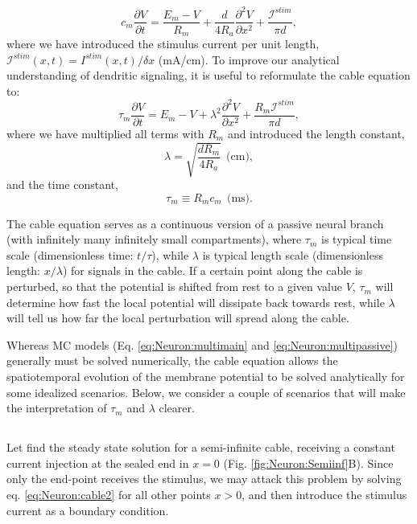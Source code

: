 \begin{equation}
c_m \frac{\partial V}{\partial t} = \frac{E_m-V}{R_m} +  \frac{d}{4 R_a}  \frac{\partial^2 V}{\partial x^2}  + \frac{\mathcal{I}^{stim}}{\pi d},
\label{eq:Neuron:cable}
\end{equation}
where we have  introduced the stimulus current per unit length, $\mathcal{I}^{stim}(x,t) = I^{stim}(x,t)/\delta x$ (mA/cm). To improve our analytical understanding of dendritic signaling, it is useful to reformulate the cable equation to:
\begin{equation}
\tau_m \frac{\partial V}{\partial t} = E_m-V +   \lambda^2  \frac{\partial^2 V}{\partial x^2}  + \frac{R_m \mathcal{I}^{stim} }{\pi d},
\label{eq:Neuron:cable2}
\end{equation}
where we have multiplied all terms with $R_m$ and introduced the length constant,
\begin{equation}
\lambda = \sqrt{\frac{d R_m}{4 R_a}} \,\; \text{(cm)}, 
\label{eq:Neuron:lengthconst}
\end{equation}
and the time constant, 
\begin{equation}
\tau_m \equiv R_m c_m  \,\; \text{(ms)}.
\label{eq:Neuron:timeconst}
\end{equation}

The cable equation serves as a continuous version of a passive neural branch (with infinitely many infinitely small compartments), where $\tau_m$ is typical time scale (dimensionless time: $t/\tau$), while $\lambda$  is typical length scale  (dimensionless length: $x/\lambda$) for signals in the cable. If a certain point along the cable is perturbed, so that the potential is shifted from rest to a given value $V$, $\tau_m$ will determine how fast the local potential will dissipate back towards rest, while $\lambda$ will tell us how far the local perturbation will spread along the cable. 

Whereas MC models (Eq. \ref{eq:Neuron:multimain} and \ref{eq:Neuron:multipassive}) generally must be solved numerically, the cable equation allows the spatiotemporal evolution of the membrane potential to be solved analytically for some idealized scenarios. Below, we consider a couple of scenarios that will  make the interpretation of $\tau_m$ and $\lambda$ clearer. 


\subsection{}
\label{sec:Neuron:cableSS}
Let find the steady state solution for a semi-infinite cable, receiving a constant current injection at the sealed end in $x=0$ (Fig. \ref{fig:Neuron:Semiinf}B). Since only the end-point receives the stimulus, we may attack this problem by solving eq. \ref{eq:Neuron:cable2} for all other points $x>0$, and then introduce the stimulus current as a boundary condition. 


